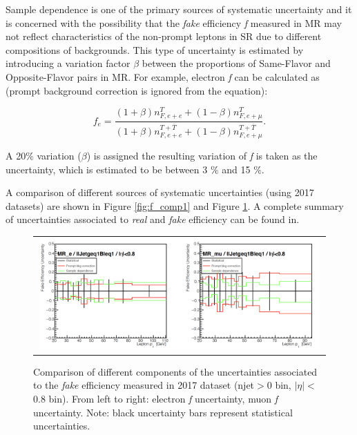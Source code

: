 Sample dependence is one of the primary sources of systematic uncertainty and it is concerned with the possibility that the \emph{fake} efficiency \emph{f} measured in MR may not reflect characteristics of the non-prompt leptons in SR due to different compositions of backgrounds. This type of uncertainty is estimated by introducing a variation factor $\beta$ between the proportions of Same-Flavor and Opposite-Flavor pairs in MR. For example, electron \emph{f} can be calculated as (prompt background correction is ignored from the equation): 

\begin{equation}
f_{e}=\frac{(1+\beta)n_{F,e+e}^{T}+(1-\beta)n_{F,e+\mu}^{T}}{(1+\beta)n_{F,e+e}^{T+\overline{T}}+(1-\beta)n_{F,e+\mu}^{T+\overline{T}}}.
 \label{eq:samp_dep}
\end{equation}

A 20$\%$ variation ($\beta$) is assigned the resulting variation of \emph{f} is taken as the uncertainty, which is estimated to be between 3 $\%$ and 15 $\%$. 
 
A comparison of different sources of systematic uncertainties (using 2017 datasets) are shown in Figure \ref{fig:f_comp1} and Figure \ref{fig:f_comp2}. A complete summary of uncertainties associated to \emph{real} and \emph{fake} efficiency can be found in.

\begin{figure}[tbh!]
 \begin{center}
 \begin{tabular}{c}
 \includegraphics[width=0.99\textwidth]{figures/Part3/Systematics/MR2}
 \end{tabular}
 \caption{Comparison of different components of the uncertainties associated to the \emph{fake} efficiency measured in 2017 dataset (njet$>$0 bin, $|\eta|<$0.8 bin). From left to right: electron \emph{f} uncertainty, muon \emph{f} uncertainty. Note: black uncertainty bars represent statistical uncertainties.}
 \label{fig:f_comp2}
 \end{center}
\end{figure}

